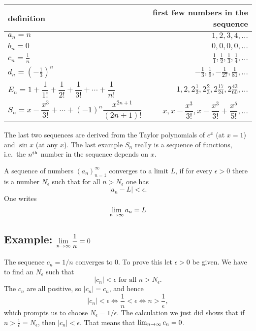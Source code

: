 \begin{center}
  \begin{tabular}{lr}
    \toprule
    \textbf{definition} &\textbf{first few numbers in the sequence}\\\midrule
    \rule[-6pt]{0pt}{18pt}
    $a_n=n  $ &
    $ 1, 2, 3, 4, \dots $ \\
    \rule[-6pt]{0pt}{18pt}
    $b_n=0 $ &
    $ 0,0,0,0, \ldots $ \\
    \rule[-6pt]{0pt}{18pt}
    $c_n=\frac1n$ &
    $ \tfrac11,\tfrac12,\tfrac13,\tfrac14,\ldots $ \\
    \rule[-12pt]{0pt}{18pt}
    $d_n=\left(-\tfrac{1}{3}\right)^n$ &
    $  -\tfrac13, \tfrac19, -\tfrac1{27}, \tfrac1{81},\ldots $ \\
    \rule[-18pt]{0pt}{18pt}
    $E_n= 1+\dfrac1{1!}+\dfrac1{2!}+\dfrac1{3!}+\cdots+\dfrac1{n!}  $ &
    $1, 2,  2\tfrac12, 2\tfrac23, 2\tfrac{17}{24},  2\tfrac{43}{60},\ldots $ \\
    \rule[-12pt]{0pt}{18pt}
    $S_n=x-\dfrac{x^3}{3!}  +\cdots+
    (-1)^n\dfrac{x^{2n+1}}{(2n+1)!}  $ &
    $ x, x-\dfrac{x^3}{3!},x-\dfrac{x^3}{3!}+\dfrac{x^5}{5!},\ldots $ \\
    \bottomrule
  \end{tabular}
  \medskip
\end{center}
The last two sequences are derived from the Taylor polynomials of $e^x$ (at
$x=1$) and $\sin x$ (at any $x$). The last example $S_n$ really is a sequence of
functions, i.e.~the $n^{\rm th}$ number in the sequence depends on $x$.

\begin{definition}
  A sequence of numbers $(a_n)_{n=1}^\infty$ converges to a limit $L$, if
  for every $\epsilon>0$ there is a number $N_\epsilon$ such that for all
  $n> N_\epsilon$ one has
  \[
  \left|a_n-L\right|<\epsilon.
  \]
  One writes
  \[
  \lim_{n\to\infty} a_n = L
  \]
\end{definition}

\subsection{Example: $\displaystyle\lim_{n\to\infty} \dfrac1n=0$} %

The sequence $c_n=1/n$ converges to $0$. To prove this let $\epsilon>0$ be
given. We have to find an $N_\epsilon$ such that
\[
|c_n|<\epsilon \text{ for all } n>N_\epsilon.
\]
The $c_n$ are all positive, so $|c_n|=c_n$, and hence
\[
|c_n|<\epsilon \iff \frac1n<\epsilon \iff n>\frac1\epsilon,
\]
which prompts us to choose $N_\epsilon=1/\epsilon$. The calculation we just
did shows that if $n>\frac1\epsilon=N_\epsilon$, then
$|c_n|<\epsilon$. That means that $\lim_{n\to\infty} c_n =0$.

